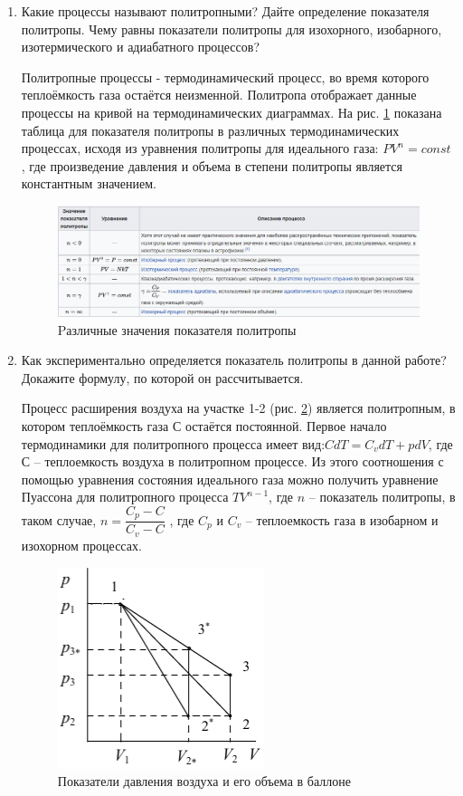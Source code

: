 \documentclass[12pt,a4paper]{article}%
\begin{document}
\begin{enumerate}
	\item Какие процессы называют политропными? Дайте определение показателя политропы.
	Чему равны показатели политропы для изохорного, изобарного, изотермического и адиабатного процессов? 
	
	Политропные процессы - термодинамический процесс, во время которого теплоёмкость газа остаётся неизменной. Политропа отображает данные процессы на кривой на термодинамических диаграммах. На рис. \ref{p2} показана таблица для показателя политропы в различных термодинамических процессах, исходя из уравнения политропы для идеального газа: $PV^n = const$
	, где произведение давления и объема в степени политропы является константным значением. 
	
	\begin{figure}[hpt!]
		\centering
		\includegraphics[width=\linewidth]{p2}
		\caption{Pазличные значения показателя политропы}
		\label{p2}
	\end{figure}
	
	
	\item Как экспериментально определяется показатель политропы в данной работе? Докажите формулу, по которой он рассчитывается.
	
	Процесс расширения воздуха на участке 1-2 (рис. \ref{p3}) является политропным, в котором теплоёмкость газа $С$ остаётся постоянной. Первое начало термодинамики для политропного процесса имеет вид:$CdT = C_vdT+pdV$, где $С$ – теплоемкость воздуха в политропном процессе. Из этого соотношения с помощью уравнения состояния идеального газа можно получить уравнение Пуассона для политропного процесса $TV^{n-1}$, где $n$ – показатель политропы, в таком случае, $n = \dfrac{C_p - C}{C_v - C}$
	, где $C_p$ и $C_v$ – теплоемкость газа в изобарном и изохорном процессах.
	
	\begin{figure}[hpt!]
		\centering
		\includegraphics[width=0.5\linewidth]{p3}
		\caption{Показатели давления воздуха и его объема в баллоне}
		\label{p3}
	\end{figure}
	

\end{enumerate}
\end{document}
